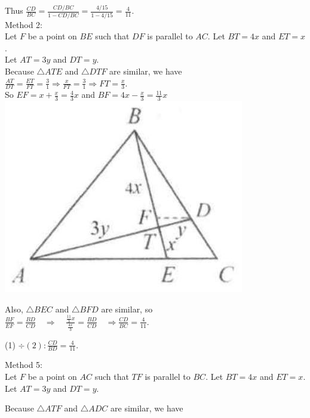 \documentclass[10pt]{article}
\begin{document}
Thus \(\frac{C D}{B C}=\frac{C D / B C}{1-C D / B C}=\frac{4 / 15}{1-4 / 15}=\frac{4}{11}\).\\
Method 2:\\
Let \(F\) be a point on \(B E\) such that \(D F\) is parallel to \(A C\). Let \(B T=4 x\) and \(E T=x\).\\
Let \(A T=3 y\) and \(D T=y\).\\
Because \(\triangle A T E\) and \(\triangle D T F\) are similar, we have\\
\(\frac{A T}{D T}=\frac{E T}{F T}=\frac{3}{1} \Rightarrow \frac{x}{F T}=\frac{3}{1} \Rightarrow F T=\frac{x}{3}\).\\
So \(E F=x+\frac{x}{3}=\frac{4}{3} x\) and \(B F=4 x-\frac{x}{3}=\frac{11}{3} x\)\\
\includegraphics[max width=\textwidth, center]{2025_04_17_97bc1f7e44d93c271a88g-104(2)}

Also, \(\triangle B E C\) and \(\triangle B F D\) are similar, so\\
\(\frac{B F}{E F}=\frac{B D}{C D} \quad \Rightarrow \quad \frac{\frac{11}{3} x}{\frac{4 x}{3}}=\frac{B D}{C D} \quad \Rightarrow \frac{C D}{B C}=\frac{4}{11}\).


(1) \(\div(2): \frac{C D}{B D}=\frac{4}{11}\).

Method 5:\\
Let \(F\) be a point on \(A C\) such that \(T F\) is parallel to \(B C\). Let \(B T=4 x\) and \(E T=x\). Let \(A T=3 y\) and \(D T=y\).

Because \(\triangle A T F\) and \(\triangle A D C\) are similar, we have
\end{document}
